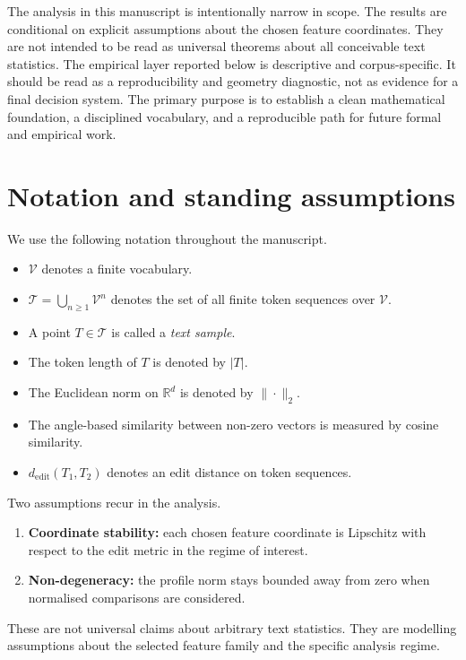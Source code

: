 \documentclass[11pt]{article}
\begin{document}
The analysis in this manuscript is intentionally narrow in scope. The results are conditional on explicit assumptions about the chosen feature coordinates. They are not intended to be read as universal theorems about all conceivable text statistics. The empirical layer reported below is descriptive and corpus-specific. It should be read as a reproducibility and geometry diagnostic, not as evidence for a final decision system. The primary purpose is to establish a clean mathematical foundation, a disciplined vocabulary, and a reproducible path for future formal and empirical work.

\section{Notation and standing assumptions}

We use the following notation throughout the manuscript.
\begin{itemize}
    \item $\mathcal{V}$ denotes a finite vocabulary.
    \item $\mathcal{T} = \bigcup_{n \geq 1} \mathcal{V}^n$ denotes the set of all finite token sequences over $\mathcal{V}$.
    \item A point $T \in \mathcal{T}$ is called a \emph{text sample}.
    \item The token length of $T$ is denoted by $|T|$.
    \item The Euclidean norm on $\mathbb{R}^d$ is denoted by $\|\cdot\|_2$.
    \item The angle-based similarity between non-zero vectors is measured by cosine similarity.
    \item $d_{\mathrm{edit}}(T_1,T_2)$ denotes an edit distance on token sequences.
\end{itemize}

Two assumptions recur in the analysis.
\begin{enumerate}[label=(A\arabic*)]
    \item \textbf{Coordinate stability:} each chosen feature coordinate is Lipschitz with respect to the edit metric in the regime of interest.
    \item \textbf{Non-degeneracy:} the profile norm stays bounded away from zero when normalised comparisons are considered.
\end{enumerate}

These are not universal claims about arbitrary text statistics. They are modelling assumptions about the selected feature family and the specific analysis regime.
\end{document}
